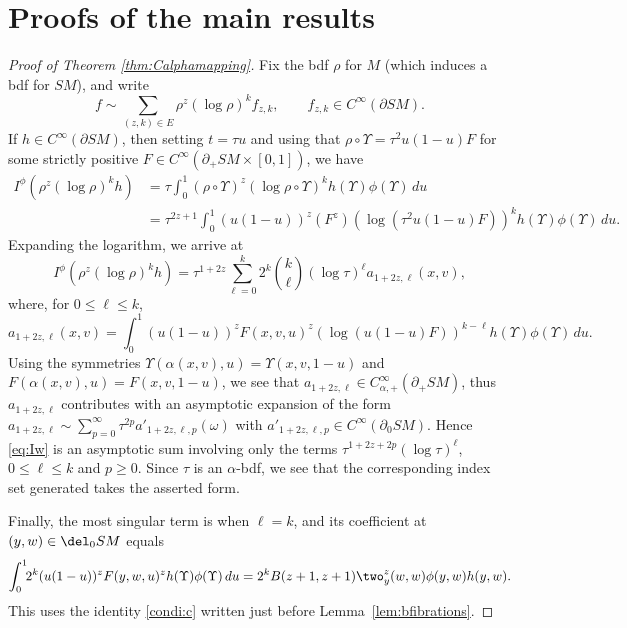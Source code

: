 \section{Proofs of the main results} \label{sec:proofmain}

 \label{sec:proofmainXray}

\begin{proof}[Proof of Theorem \ref{thm:Calphamapping}] Fix the bdf $\rho$ for $M$ (which induces a bdf for $SM$), and write\vspace*{-3pt}
\begin{equation*}
f \sim \sum_{(z,k)\in E} \rho^z (\log \rho)^k f_{z,k}, \qquad f_{z,k}\in C^\infty(\partial SM).
\end{equation*}
If $h \in C^\infty(\partial SM)$, then setting $t = \tau u$ and using that $\rho\circ \Upsilon = \tau^2 u(1-u) F$ for
some strictly positive $F\in C^\infty(\partial_+ SM \times [0,1])$, we have\vspace*{-3pt}\enlargethispage{1\baselineskip}
\begin{align*}
I^\phi (\rho^z (\log \rho)^k h) &= \tau \int_0^1 (\rho\circ\Upsilon)^z (\log \rho\circ \Upsilon)^k h(\Upsilon) \phi(\Upsilon)\,du \\[-3pt]
&= \tau^{2z + 1} \int_0^1 (u(1-u))^z (F^z) (\log (\tau^2 u(1-u) F))^k h(\Upsilon) \phi(\Upsilon)\,du.
\end{align*}
Expanding the logarithm, we arrive at\vspace*{-5pt}
\begin{equation}
I^\phi (\rho^z (\log \rho)^k h) = \tau^{1+2z} \sum_{\ell=0}^k 2^k \binom{k}{\ell} (\log \tau)^\ell a_{1+2z, \ell}(x,v),
\label{eq:Iw}
\end{equation}
where, for $0\le \ell\le k$,\vspace*{-5pt}
\begin{equation*}
a_{1+2z, \ell}(x,v) = \int_0^1 (u(1-u))^z F(x,v,u)^z (\log(u(1-u)F))^{k-\ell} h(\Upsilon) \phi(\Upsilon)\,du.
\end{equation*}
Using the symmetries $\Upsilon(\alpha(x,v), u) = \Upsilon(x,v,1-u)$ and $F(\alpha(x,v),u) = F(x,v,1-u)$, we see that
$a_{1+2z,\ell} \in C^\infty_{\alpha,+}(\partial_{+}SM)$, thus $a_{1+2z,\ell}$ contributes with an asymptotic expansion of the form $a_{1+2z,\ell} \sim \sum_{p=0}^\infty \tau^{2p} a'_{1+2z,\ell,p}(\omega)$ with $a'_{1+2z,\ell,p}\in C^\infty(\partial_0 SM)$. Hence \eqref{eq:Iw} is an asymptotic sum involving only the terms $\tau^{1+2z+2p}(\log \tau)^\ell$, $0\le \ell\le k$ and $p\ge 0$. Since $\tau$ is an $\alpha$-bdf, we see that the corresponding index set generated takes the asserted form.

Finally, the most singular term is when $\ell = k$, and its coefficient at $(y,w) \in \del_0 SM$ equals\vspace*{-3pt}
\[
\int_0^1 \!\! 2^k (u(1-u))^z F(y,w,u)^z h(\Upsilon) \phi(\Upsilon)\, du = 2^k B(z+1, z+1) \two_y^z(w, w) \phi(y,w) h(y,w) .
\]
This uses the identity \eqref{condi:c} written just before Lemma~\ref{lem:bfibrations}.
\end{proof}

